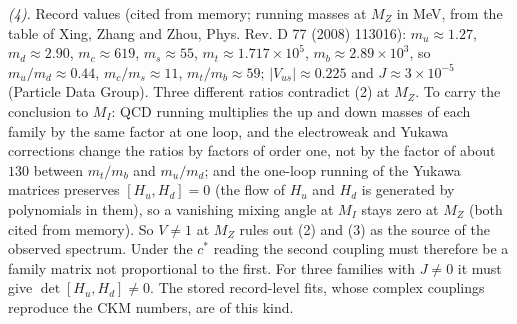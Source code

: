 \emph{(4).} Record values (cited from memory; running masses at $M_{Z}$ in MeV, from the table of Xing, Zhang and Zhou, Phys. Rev. D 77 (2008) 113016): $m_{u} \approx 1.27$, $m_{d} \approx 2.90$, $m_{c} \approx 619$, $m_{s} \approx 55$, $m_{t} \approx 1.717 \times 10^{5}$, $m_{b} \approx 2.89 \times 10^{3}$, so $m_{u}/m_{d} \approx 0.44$, $m_{c}/m_{s} \approx 11$, $m_{t}/m_{b} \approx 59$; $|V_{us}| \approx 0.225$ and $J \approx 3 \times 10^{-5}$ (Particle Data Group). Three different ratios contradict (2) at $M_{Z}$. To carry the conclusion to $M_{I}$: QCD running multiplies the up and down masses of each family by the same factor at one loop, and the electroweak and Yukawa corrections change the ratios by factors of order one, not by the factor of about $130$ between $m_{t}/m_{b}$ and $m_{u}/m_{d}$; and the one-loop running of the Yukawa matrices preserves $[H_{u}, H_{d}] = 0$ (the flow of $H_{u}$ and $H_{d}$ is generated by polynomials in them), so a vanishing mixing angle at $M_{I}$ stays zero at $M_{Z}$ (both cited from memory). So $V \ne 1$ at $M_{Z}$ rules out (2) and (3) as the source of the observed spectrum. Under the $c^{*}$ reading the second coupling must therefore be a family matrix not proportional to the first. For three families with $J \ne 0$ it must give $\det[H_{u}, H_{d}] \ne 0$. The stored record-level fits, whose complex couplings reproduce the CKM numbers, are of this kind.
